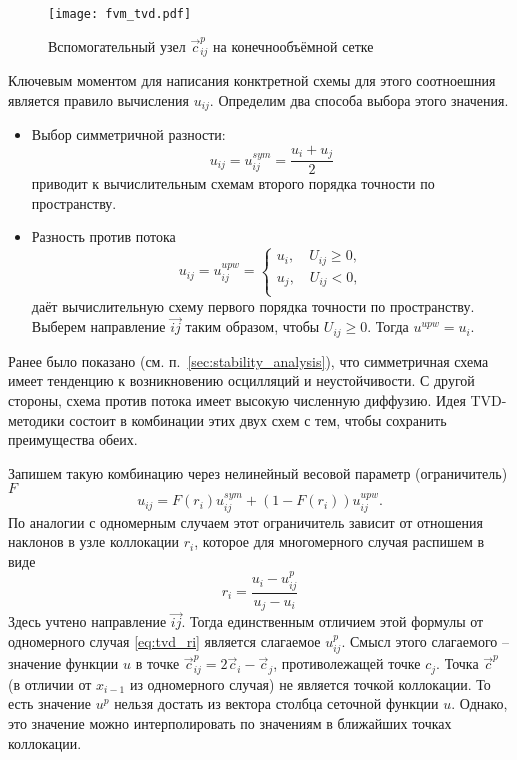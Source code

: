 \begin{figure}[h!]
\centering
\texttt{[image: fvm\_tvd.pdf]}
\caption{Вспомогательный узел $\vec c^p_{ij}$ на конечнообъёмной сетке}
\label{fig:fvm_tvd}
\end{figure}

Ключевым моментом для написания конктретной схемы
для этого соотноешния является
правило вычисления $u_{ij}$.
Определим два способа выбора этого значения.
\begin{itemize}
\item Выбор симметричной разности:
\begin{equation}
\nonumber
u_{ij} = u^{sym}_{ij} = \frac{u_i + u_j}{2}
\end{equation}
приводит к вычислительным схемам
второго порядка точности по пространству.
\item Разность против потока
\begin{equation}
\label{eq:tvd_upw}
u_{ij} = u^{upw}_{ij} =
\begin{cases}
u_i, \quad U_{ij} \geq 0, \\
u_j, \quad U_{ij} < 0, \\
\end{cases}
\end{equation}
даёт вычислительную схему
первого порядка точности по пространству.
Выберем направление $\overrightarrow{ij}$ 
таким образом, чтобы $U_{ij} \geq 0$.
Тогда $u^{upw} = u_i$.
\end{itemize}

Ранее было показано (см. п.~\ref{sec:stability_analysis}), что
симметричная схема имеет тенденцию
к возникновению осцилляций и неустойчивости.
С другой стороны, схема против потока имеет высокую 
численную диффузию.
Идея TVD-методики
состоит в комбинации этих двух
схем с тем, чтобы сохранить преимущества обеих.

Запишем такую комбинацию через
нелинейный весовой параметр (ограничитель) $F$
\begin{equation}
\label{eq:tvd_uij}
u_{ij} = F(r_i) u_{ij}^{sym} + (1 - F(r_i)) u_{ij}^{upw}.
\end{equation}
По аналогии с одномерным случаем
этот ограничитель
зависит от отношения наклонов в узле коллокации $r_i$,
которое для многомерного случая распишем в виде
\begin{equation}
\label{eq:tvd_ri_fvm}
r_i = \frac{u_i - u_{ij}^p}{u_j - u_i}
\end{equation}
Здесь учтено направление $\overrightarrow{ij}$.
Тогда единственным отличием
этой формулы от одномерного случая \cref{eq:tvd_ri}
является слагаемое $u_{ij}^p$.
Смысл этого слагаемого -- значение функции
$u$ в точке $\vec c^p_{ij} = 2\vec c_i - \vec c_j$, противолежащей точке $c_j$.
Точка $\vec c^p$ (в отличии от $x_{i-1}$ из одномерного случая)
не является точкой коллокации. То есть
значение $u^p$ нельзя достать из вектора столбца сеточной функции $u$.
Однако, это значение можно интерполировать
по значениям в ближайших точках коллокации.

